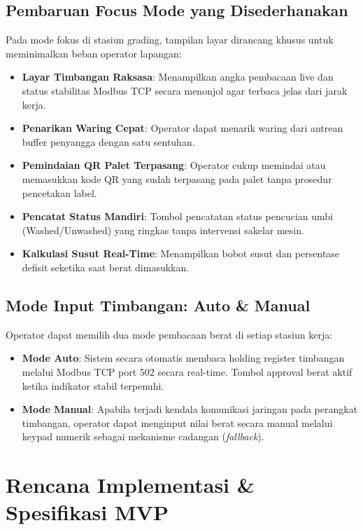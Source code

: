 \documentclass[12pt,a4paper]{article}
\begin{document}
\subsection{Pembaruan Focus Mode yang Disederhanakan}
Pada mode fokus di stasiun grading, tampilan layar dirancang khusus untuk meminimalkan beban operator lapangan:
\begin{itemize}
  \item \textbf{Layar Timbangan Raksasa}: Menampilkan angka pembacaan live dan status stabilitas Modbus TCP secara menonjol agar terbaca jelas dari jarak kerja.
  \item \textbf{Penarikan Waring Cepat}: Operator dapat menarik waring dari antrean buffer penyangga dengan satu sentuhan.
  \item \textbf{Pemindaian QR Palet Terpasang}: Operator cukup memindai atau memasukkan kode QR yang sudah terpasang pada palet tanpa prosedur pencetakan label.
  \item \textbf{Pencatat Status Mandiri}: Tombol pencatatan status pencucian umbi (Washed/Unwashed) yang ringkas tanpa intervensi sakelar mesin.
  \item \textbf{Kalkulasi Susut Real-Time}: Menampilkan bobot susut dan persentase defisit seketika saat berat dimasukkan.
\end{itemize}

\subsection{Mode Input Timbangan: Auto \& Manual}
Operator dapat memilih dua mode pembacaan berat di setiap stasiun kerja:
\begin{itemize}
  \item \textbf{Mode Auto}: Sistem secara otomatis membaca holding register timbangan melalui Modbus TCP port 502 secara real-time. Tombol approval berat aktif ketika indikator stabil terpenuhi.
  \item \textbf{Mode Manual}: Apabila terjadi kendala komunikasi jaringan pada perangkat timbangan, operator dapat menginput nilai berat secara manual melalui keypad numerik sebagai mekanisme cadangan (\emph{fallback}).
\end{itemize}

\section{Rencana Implementasi \& Spesifikasi MVP}
\end{document}
